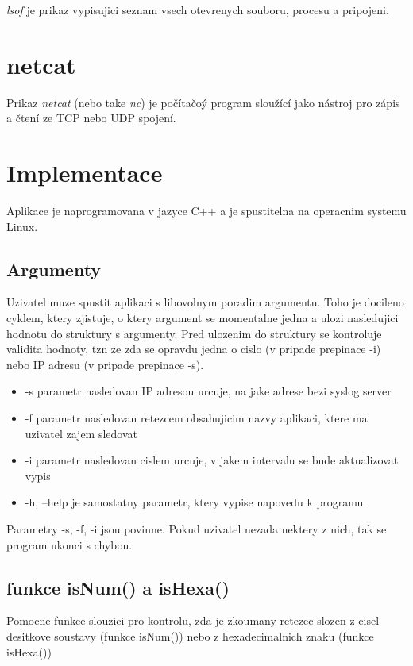 \documentclass[a4paper]{article}
\begin{document}
	\emph{lsof} je prikaz vypisujici seznam vsech otevrenych souboru, procesu a pripojeni.

	\section{netcat}

	Prikaz \emph{netcat} (nebo take \emph{nc}) je počítačoý program sloužící jako nástroj pro zápis a čtení ze TCP nebo UDP spojení.

	\section{Implementace}

	Aplikace je naprogramovana v jazyce C++ a je spustitelna na operacnim systemu Linux.

	\subsection{Argumenty}

	Uzivatel muze spustit aplikaci s libovolnym poradim argumentu. Toho je docileno cyklem, ktery zjistuje, o ktery argument se momentalne jedna a ulozi nasledujici hodnotu do struktury s argumenty. Pred ulozenim do struktury se kontroluje validita hodnoty, tzn ze zda se opravdu jedna o cislo (v pripade prepinace -i) nebo IP adresu (v pripade prepinace -s).
	\begin{itemize}
		\item -s parametr nasledovan IP adresou urcuje, na jake adrese bezi syslog server
		\item -f parametr nasledovan retezcem obsahujicim nazvy aplikaci, ktere ma uzivatel zajem sledovat
		\item -i parametr nasledovan cislem urcuje, v jakem intervalu se bude aktualizovat vypis
		\item -h, --help je samostatny parametr, ktery vypise napovedu k programu
	\end{itemize}
	Parametry -s, -f, -i jsou povinne. Pokud uzivatel nezada nektery z nich, tak se program ukonci s chybou.

	\subsection{funkce isNum() a isHexa()}

	Pomocne funkce slouzici pro kontrolu, zda je zkoumany retezec slozen z cisel desitkove soustavy (funkce isNum()) nebo z hexadecimalnich znaku (funkce isHexa())
\end{document}
